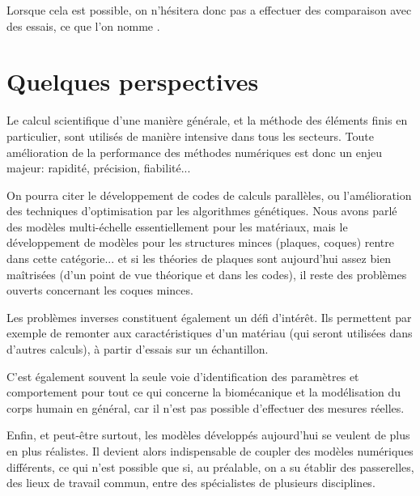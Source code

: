 Lorsque cela est possible, on n'hésitera donc pas a effectuer des comparaison avec des essais, ce que l'on nomme .



\medskip
\section*{Quelques perspectives}

Le calcul scientifique d'une manière générale, et la méthode des éléments finis en particulier, sont utilisés de manière intensive dans tous les secteurs.
\medskipvm
Toute amélioration de la performance des méthodes numériques est donc un enjeu majeur: rapidité, précision, fiabilité...

On pourra citer le développement de codes de calculs parallèles, ou l'amélioration des techniques d'optimisation par les algorithmes génétiques.
\medskipvm
Nous avons parlé des modèles multi-échelle essentiellement pour les matériaux, mais le développement de modèles pour les structures minces (plaques, coques) rentre dans cette catégorie... et si les théories de plaques sont aujourd'hui assez bien maîtrisées (d'un point de vue théorique et dans les codes), il reste des problèmes ouverts concernant les coques minces.

\medskip
Les problèmes inverses constituent également un défi d'intérêt. Ils permettent par exemple de remonter aux caractéristiques d'un matériau (qui seront utilisées dans d'autres calculs), à partir d'essais sur un échantillon.

C'est également souvent la seule voie d'identification des paramètres et comportement pour tout ce qui concerne la biomécanique et la modélisation du corps humain en général, car il n'est pas possible d'effectuer des mesures réelles.

\medskip
Enfin, et peut-être surtout, les modèles développés aujourd'hui se veulent de plus en plus réalistes. Il devient alors indispensable de coupler des modèles numériques différents, ce qui n'est possible que si, au préalable, on a su établir des passerelles, des lieux de travail commun, entre des spécialistes de plusieurs disciplines.
